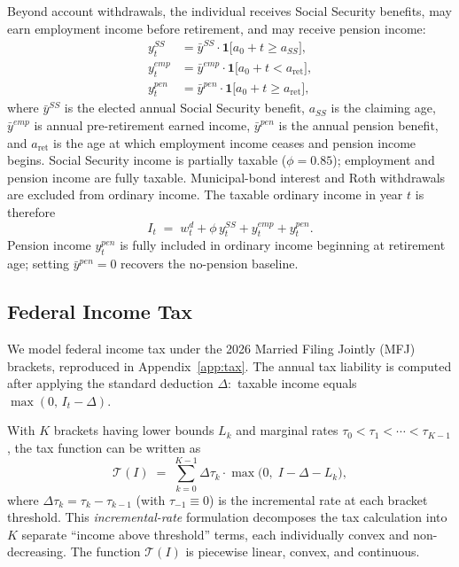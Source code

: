 \documentclass[12pt]{article}
\newcommand{\Tax}{\mathcal{T}}
\begin{document}
Beyond account withdrawals, the individual receives Social Security benefits,
may earn employment income before retirement, and may receive pension income:
\begin{align}
  y^{SS}_t    &= \bar{y}^{SS} \cdot \mathbf{1}\bigl[a_0 + t \geq a_{SS}\bigr],
  \label{eq:ss} \\
  y^{emp}_t   &= \bar{y}^{emp} \cdot \mathbf{1}\bigl[a_0 + t < a_{\mathrm{ret}}\bigr],
  \label{eq:emp} \\
  y^{pen}_t   &= \bar{y}^{pen} \cdot \mathbf{1}\bigl[a_0 + t \geq a_{\mathrm{ret}}\bigr],
  \label{eq:pen}
\end{align}
where $\bar{y}^{SS}$ is the elected annual Social Security benefit, $a_{SS}$
is the claiming age, $\bar{y}^{emp}$ is annual pre-retirement earned income,
$\bar{y}^{pen}$ is the annual pension benefit, and $a_{\mathrm{ret}}$ is the age
at which employment income ceases and pension income begins.
Social Security income is partially taxable ($\phi = 0.85$); employment and pension income are fully taxable.
Municipal-bond interest and Roth withdrawals are excluded from ordinary income. The taxable ordinary
income in year $t$ is therefore
\begin{equation}
  I_t \;=\; w^d_t + \phi\,y^{SS}_t + y^{emp}_t + y^{pen}_t.
  \label{eq:income}
\end{equation}
Pension income $y^{pen}_t$ is fully included in ordinary income beginning at
retirement age; setting $\bar{y}^{pen} = 0$ recovers the no-pension baseline.


\subsection{Federal Income Tax}
\label{sec:tax}

We model federal income tax under the 2026 Married Filing Jointly (MFJ)
brackets, reproduced in Appendix~\ref{app:tax}. The annual tax liability is
computed after applying the standard deduction $\Delta$:\ taxable income
equals $\max(0,\, I_t - \Delta)$.

With $K$ brackets having lower bounds $L_k$ and marginal rates
$\tau_0 < \tau_1 < \cdots < \tau_{K-1}$, the tax function can be written as
\begin{equation}
  \Tax(I) \;=\; \sum_{k=0}^{K-1} \Delta\tau_k \cdot \max\!\bigl(0,\;
                I - \Delta - L_k\bigr),
  \label{eq:tax}
\end{equation}
where $\Delta\tau_k = \tau_k - \tau_{k-1}$ (with $\tau_{-1} \equiv 0$) is the
incremental rate at each bracket threshold. This \emph{incremental-rate}
formulation decomposes the tax calculation into $K$ separate
``income above threshold'' terms, each individually convex and non-decreasing.
The function $\Tax(I)$ is piecewise linear, convex, and continuous.
\end{document}
